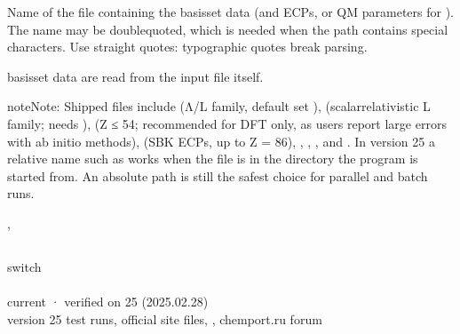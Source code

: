\documentclass[letterpaper,10pt,english,openany,oneside]{sphinxmanual}
\begin{document}
\sphinxAtStartPar
Name of the file containing the basis\sphinxhyphen{}set data (and ECPs, or QM parameters for ). The name may be
double\sphinxhyphen{}quoted, which is needed when the path contains special characters. Use straight quotes: typographic
quotes break parsing.

\sphinxAtStartPar
{} basis\sphinxhyphen{}set data are read from the input file itself.

\begin{sphinxadmonition}{note}{Note:}
\sphinxAtStartPar
Shipped files include  (Λ/L family, default set ),  (scalar\sphinxhyphen{}relativistic L family;
needs ),  (Z ≤ 54; recommended for DFT only, as users report large errors with ab initio methods),  (SBK ECPs, up to Z = 86), , ,
, and . In version 25 a relative name such as  works when the file is in the
directory the program is started from. An absolute path is still the safest choice for parallel and batch
runs.
\end{sphinxadmonition}

\sphinxAtStartPar
{} {\hyperref[\detokenize{reference/molecule:molecule-set}]{}}, {\hyperref[\detokenize{reference/control:control-four}]{}}


\subsection{}
\label{\detokenize{reference/control:four}}\label{\detokenize{reference/control:control-four}}
\ignorespaces 
\sphinxAtStartPar
{} switch\\
 \\
 current · verified on 25 (2025.02.28)\\
 version 25 test runs, official site files, , chemport.ru forum
\end{document}

